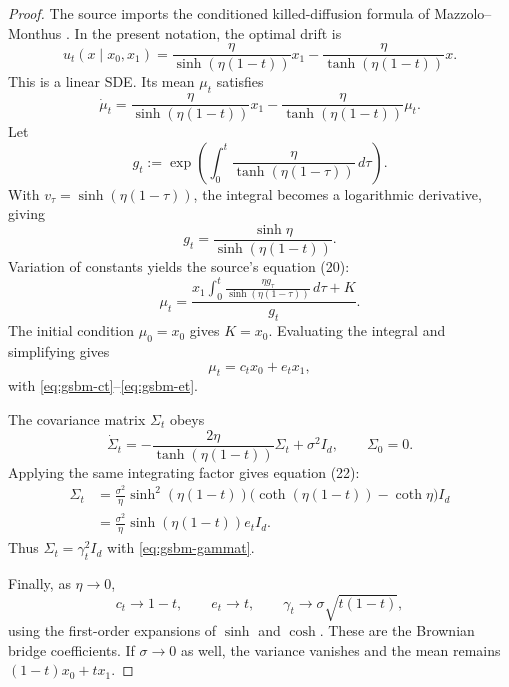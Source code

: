 \begin{proof}
The source imports the conditioned killed-diffusion formula of
Mazzolo--Monthus \cite[Eq.~(84)]{MazzoloMonthus2022}.  In the present notation,
the optimal drift is
\begin{equation}
  u_t(x\mid x_0,x_1)
  =\frac{\eta}{\sinh(\eta(1-t))}x_1
   -\frac{\eta}{\tanh(\eta(1-t))}x.
  \tag{19}\label{eq:gsbm-linear-drift}
\end{equation}
This is a linear SDE.  Its mean $\mu_t$ satisfies
\[
  \dot\mu_t
  =\frac{\eta}{\sinh(\eta(1-t))}x_1
   -\frac{\eta}{\tanh(\eta(1-t))}\mu_t.
\]
Let
\[
  g_t:=\exp\left(
    \int_0^t\frac{\eta}{\tanh(\eta(1-\tau))}\,d\tau
  \right).
\]
With $v_\tau=\sinh(\eta(1-\tau))$, the integral becomes a logarithmic
derivative, giving
\[
  g_t=\frac{\sinh\eta}{\sinh(\eta(1-t))}.
\]
Variation of constants yields the source's equation (20):
\[
  \mu_t
  =\frac{
      x_1\int_0^t
      \frac{\eta g_\tau}{\sinh(\eta(1-\tau))}\,d\tau+K
    }{g_t}.
\]
The initial condition $\mu_0=x_0$ gives $K=x_0$.  Evaluating the integral and
simplifying gives
\[
  \mu_t=c_t x_0+e_t x_1,
\]
with \eqref{eq:gsbm-ct}--\eqref{eq:gsbm-et}.

The covariance matrix $\Sigma_t$ obeys
\[
  \dot\Sigma_t
  =-\frac{2\eta}{\tanh(\eta(1-t))}\Sigma_t+\sigma^2 I_d,
  \qquad \Sigma_0=0.
\]
Applying the same integrating factor gives equation (22):
\begin{align*}
  \Sigma_t
  &=\frac{\sigma^2}{\eta}
  \sinh^2(\eta(1-t))
  \bigl(\coth(\eta(1-t))-\coth\eta\bigr)I_d\\
  &=\frac{\sigma^2}{\eta}
  \sinh(\eta(1-t))e_t I_d.
\end{align*}
Thus $\Sigma_t=\gamma_t^2I_d$ with \eqref{eq:gsbm-gammat}.

Finally, as $\eta\to0$,
\[
  c_t\to1-t,
  \qquad
  e_t\to t,
  \qquad
  \gamma_t\to\sigma\sqrt{t(1-t)},
\]
using the first-order expansions of $\sinh$ and $\cosh$.  These are the
Brownian bridge coefficients.  If $\sigma\to0$ as well, the variance vanishes
and the mean remains $(1-t)x_0+tx_1$.
\end{proof}

